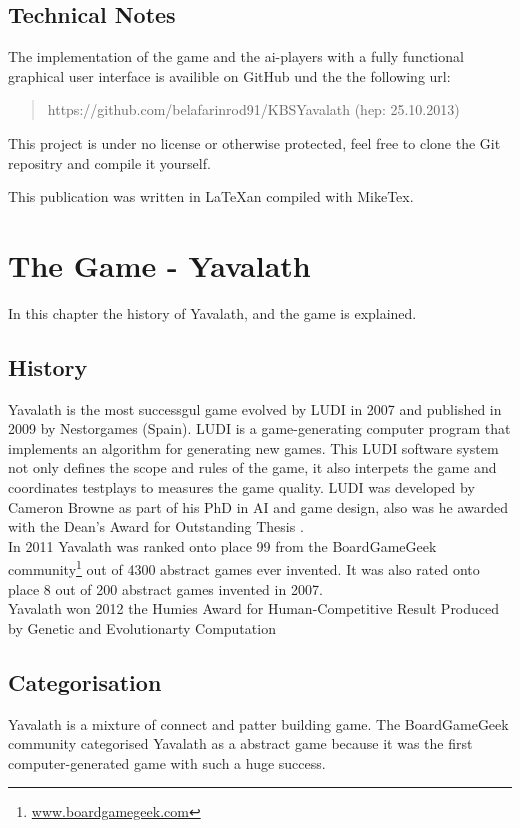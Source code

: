 \documentclass[german]{report}
\begin{document}
\section{Technical Notes}
The implementation of the game and the ai-players with a fully functional
graphical user interface is availible on GitHub und the the following url:
\begin{quotation}
    https://github.com/belafarinrod91/KBSYavalath (hep: 25.10.2013)
\end{quotation}
This project is under no license or otherwise protected, feel free to clone the
Git repositry and compile it yourself.


This publication was written in \LaTeX an compiled with MikeTex.

\chapter{The Game - Yavalath}
\label{sec:chapter2}
In this chapter the history of Yavalath, and the game is explained.
\section{History}
Yavalath is the most successgul game evolved by LUDI in 2007 and published in 2009 by Nestorgames (Spain). LUDI is a game-generating computer program 
that implements an algorithm for generating new games. This LUDI software system not only defines the scope and rules of the game, it also interpets 
the game and coordinates testplays to measures the game quality.
LUDI was developed by Cameron Browne as part of his PhD in AI and game design,
also was he awarded with the Dean's Award for Outstanding Thesis
\cite{EvolutionGameDesign}. \\

In 2011 Yavalath was ranked onto place 99 from the BoardGameGeek
community\footnote{\url{www.boardgamegeek.com}} out of 4300 abstract games ever invented.
It was also rated onto place 8 out of 200 abstract games invented in 2007. \\

Yavalath won 2012 the Humies Award for Human-Competitive Result Produced by Genetic and Evolutionarty Computation

\section{Categorisation}
Yavalath is a mixture of connect and patter building game. The BoardGameGeek
community categorised Yavalath as a abstract game because it was the first
computer-generated game with such a huge success.
\end{document}
